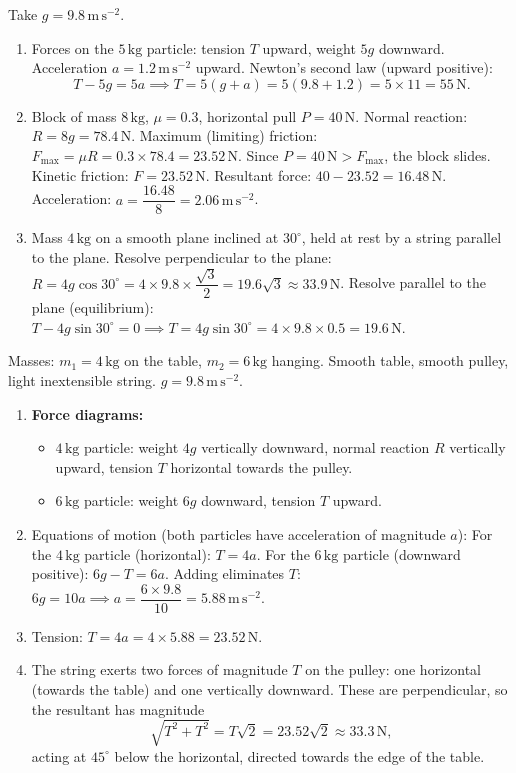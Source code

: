 \documentclass[11pt]{article}
\begin{document}
\begin{corrige}
Take $g = 9.8\,\mathrm{m\,s^{-2}}$.
\begin{enumerate}
\item Forces on the $5\,\mathrm{kg}$ particle: tension $T$ upward, weight $5g$ downward. Acceleration $a = 1.2\,\mathrm{m\,s^{-2}}$ upward. Newton's second law (upward positive):
\[T - 5g = 5a \implies T = 5(g+a) = 5(9.8+1.2) = 5\times 11 = 55\,\mathrm{N}.\]
\item Block of mass $8\,\mathrm{kg}$, $\mu = 0.3$, horizontal pull $P = 40\,\mathrm{N}$.
Normal reaction: $R = 8g = 78.4\,\mathrm{N}$.
Maximum (limiting) friction: $F_{\max} = \mu R = 0.3\times 78.4 = 23.52\,\mathrm{N}$.
Since $P = 40\,\mathrm{N} > F_{\max}$, the block slides. Kinetic friction: $F = 23.52\,\mathrm{N}$.
Resultant force: $40 - 23.52 = 16.48\,\mathrm{N}$.
Acceleration: $a = \dfrac{16.48}{8} = 2.06\,\mathrm{m\,s^{-2}}$.
\item Mass $4\,\mathrm{kg}$ on a smooth plane inclined at $30^\circ$, held at rest by a string parallel to the plane.
Resolve perpendicular to the plane: $R = 4g\cos30^\circ = 4\times 9.8\times \dfrac{\sqrt{3}}{2} = 19.6\sqrt{3} \approx 33.9\,\mathrm{N}$.
Resolve parallel to the plane (equilibrium): $T - 4g\sin30^\circ = 0 \implies T = 4g\sin30^\circ = 4\times 9.8\times 0.5 = 19.6\,\mathrm{N}$.
\end{enumerate}
\end{corrige}

\begin{corrige}
Masses: $m_1 = 4\,\mathrm{kg}$ on the table, $m_2 = 6\,\mathrm{kg}$ hanging. Smooth table, smooth pulley, light inextensible string. $g = 9.8\,\mathrm{m\,s^{-2}}$.
\begin{enumerate}
\item \textbf{Force diagrams:}
\begin{itemize}
\item $4\,\mathrm{kg}$ particle: weight $4g$ vertically downward, normal reaction $R$ vertically upward, tension $T$ horizontal towards the pulley.
\item $6\,\mathrm{kg}$ particle: weight $6g$ downward, tension $T$ upward.
\end{itemize}
\item Equations of motion (both particles have acceleration of magnitude $a$):
For the $4\,\mathrm{kg}$ particle (horizontal): $T = 4a$.
For the $6\,\mathrm{kg}$ particle (downward positive): $6g - T = 6a$.
Adding eliminates $T$: $6g = 10a \implies a = \dfrac{6\times 9.8}{10} = 5.88\,\mathrm{m\,s^{-2}}$.
\item Tension: $T = 4a = 4\times 5.88 = 23.52\,\mathrm{N}$.
\item The string exerts two forces of magnitude $T$ on the pulley: one horizontal (towards the table) and one vertically downward. These are perpendicular, so the resultant has magnitude
\[\sqrt{T^2 + T^2} = T\sqrt{2} = 23.52\sqrt{2} \approx 33.3\,\mathrm{N},\]
acting at $45^\circ$ below the horizontal, directed towards the edge of the table.
\end{enumerate}
\end{corrige}
\end{document}
